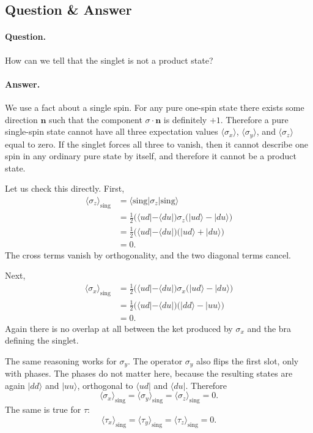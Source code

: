 \subsection{Question \& Answer}

\paragraph{Question.} How can we tell that the singlet is not a product state?

\paragraph{Answer.} We use a fact about a single spin. For any pure one-spin state there exists some direction \(\mathbf n\) such that the component \(\sigma\cdot \mathbf n\) is definitely \(+1\). Therefore a pure single-spin state cannot have all three expectation values \(\langle \sigma_x\rangle\), \(\langle \sigma_y\rangle\), and \(\langle \sigma_z\rangle\) equal to zero. If the singlet forces all three to vanish, then it cannot describe one spin in any ordinary pure state by itself, and therefore it cannot be a product state.

Let us check this directly. First,
\begin{align}
\langle \sigma_z\rangle_{\mathrm{sing}}
&=
\langle \mathrm{sing}|\sigma_z|\mathrm{sing}\rangle
\nonumber\\
&=
\frac{1}{2}
\bigl(\langle ud|-\langle du|\bigr)
\sigma_z
\bigl(|ud\rangle-|du\rangle\bigr)
\nonumber\\
&=
\frac{1}{2}
\bigl(\langle ud|-\langle du|\bigr)
\bigl(|ud\rangle+|du\rangle\bigr)
\nonumber\\
&=0.
\end{align}
The cross terms vanish by orthogonality, and the two diagonal terms cancel.

Next,
\begin{align}
\langle \sigma_x\rangle_{\mathrm{sing}}
&=
\frac{1}{2}
\bigl(\langle ud|-\langle du|\bigr)
\sigma_x
\bigl(|ud\rangle-|du\rangle\bigr)
\nonumber\\
&=
\frac{1}{2}
\bigl(\langle ud|-\langle du|\bigr)
\bigl(|dd\rangle-|uu\rangle\bigr)
\nonumber\\
&=0.
\end{align}
Again there is no overlap at all between the ket produced by \(\sigma_x\) and the bra defining the singlet.

The same reasoning works for \(\sigma_y\). The operator \(\sigma_y\) also flips the first slot, only with phases. The phases do not matter here, because the resulting states are again \(|dd\rangle\) and \(|uu\rangle\), orthogonal to \(\langle ud|\) and \(\langle du|\). Therefore
\begin{equation}
\langle \sigma_x\rangle_{\mathrm{sing}}
=
\langle \sigma_y\rangle_{\mathrm{sing}}
=
\langle \sigma_z\rangle_{\mathrm{sing}}
=0.
\end{equation}
The same is true for \(\tau\):
\begin{equation}
\langle \tau_x\rangle_{\mathrm{sing}}
=
\langle \tau_y\rangle_{\mathrm{sing}}
=
\langle \tau_z\rangle_{\mathrm{sing}}
=0.
\end{equation}

